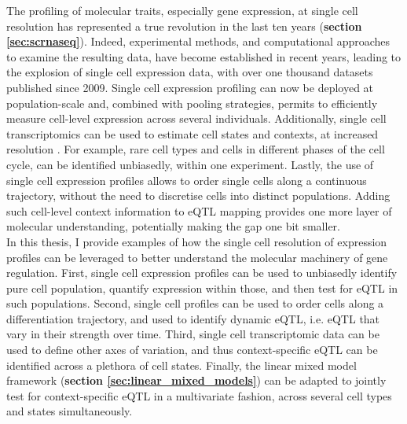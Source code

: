 The profiling of molecular traits, especially gene expression, at single cell resolution has represented a true revolution in the last ten years (\textbf{section
\ref{sec:scrnaseq}}).
Indeed, experimental methods, and computational approaches to examine the resulting data, have become established in recent years, leading to the explosion of single cell expression data, with over one thousand datasets published since 2009.
Single cell expression profiling can now be deployed at population-scale and, combined with pooling strategies, permits to efficiently measure cell-level expression across several individuals.
Additionally, single cell transcriptomics can be used to estimate cell states and contexts, at increased resolution \cite{buettner2017f}.
For example, rare cell types and cells in different phases of the cell cycle, can be identified unbiasedly, within one experiment.
Lastly, the use of single cell expression profiles allows to order single cells along a continuous trajectory, without the need to discretise cells into distinct populations.
Adding such cell-level context information to eQTL mapping provides one more layer of molecular understanding, potentially making the gap one bit smaller.\\

In this thesis, I provide examples of how the single cell resolution of expression profiles can be leveraged to better understand the molecular machinery of gene regulation.
First, single cell expression profiles can be used to unbiasedly identify pure cell population, quantify expression within those, and then test for eQTL in such populations.
Second, single cell profiles can be used to order cells along a differentiation trajectory, and used to identify dynamic eQTL, i.e. eQTL that vary in their strength over time.
Third, single cell transcriptomic data can be used to define other axes of variation, and thus context-specific eQTL can be identified across a plethora of cell states.
Finally, the linear mixed model framework (\textbf{section
\ref{sec:linear_mixed_models}}) can be adapted to jointly test for context-specific eQTL in a multivariate fashion, across several cell types and states simultaneously.\\

